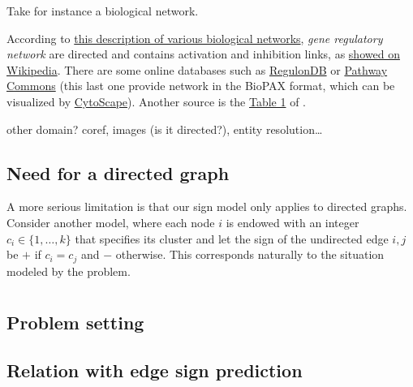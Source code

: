 \documentclass[nobib, a4paper, 10pt, oneside, onecolumn, openany, notitlepage, final,
svgnames, marginals=raggedouter, english,
]{article}
\begin{document}
Take for instance a biological network.

According to \href{https://web.stanford.edu/class/cs224w/slides/handout-bionets.pdf}%
{this description of various biological networks}, \emph{gene regulatory network} are directed and
contains activation and inhibition links, as \href{https://en.wikipedia.org/wiki/Gene_regulatory_network#Overview}%
{showed on Wikipedia}. There are some online databases such as
\href{http://regulondb.ccg.unam.mx/menu/download/datasets/index.jsp}%
{RegulonDB} or \href{http://www.pathwaycommons.org/pcviz/}{Pathway Commons} (this last one provide
network in the BioPAX format, which can be visualized by
\href{http://www.cytoscape.org/}{CytoScape}).
Another source is the \href{https://www.ncbi.nlm.nih.gov/pmc/articles/PMC2708159/table/T1}{Table 1}
of \cite{BioSigned09}.

other domain? coref, images (is it directed?), entity resolution…

\subsection{Need for a directed graph}
\label{sub:need_for_a_directed_graph}


A more serious limitation is that our sign model only applies to directed graphs. Consider
another model, where each node $i$ is endowed with an integer $c_i \in \{1, \ldots, k\}$ that
specifies its cluster and let the sign of the undirected edge $i,j$ be $+$ if $c_i = c_j$ and $-$
otherwise.  This corresponds naturally to the situation modeled by the \pcc{} problem.

\section{\pcc{}}
\label{sec:correlation_clustering}

\subsection{Problem setting}
\label{sub:problem_setting}

\subsection{Relation with edge sign prediction}
\label{sub:relation_with_edge_sign_prediction}
\end{document}
